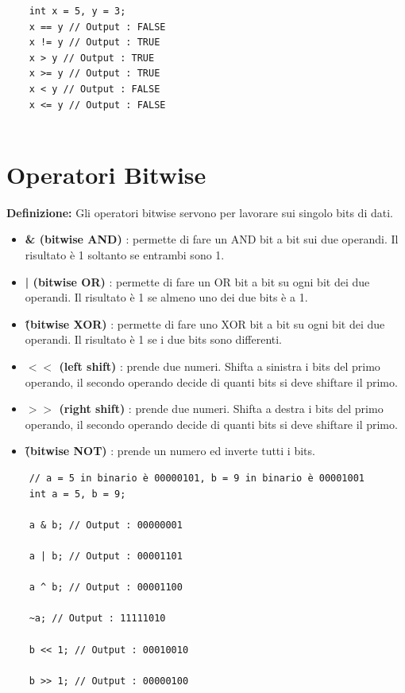 \begin{lstlisting}
	int x = 5, y = 3;
	x == y // Output : FALSE
	x != y // Output : TRUE
	x > y // Output : TRUE
	x >= y // Output : TRUE
	x < y // Output : FALSE
	x <= y // Output : FALSE
	
\end{lstlisting}


\section{Operatori Bitwise}

\textsf{\small \textbf{Definizione: } Gli operatori bitwise servono per lavorare sui singolo bits di dati.} \\

\begin{itemize}
	\item \textsf{\small \textbf{\& (bitwise AND)} : permette di fare un AND bit a bit sui due operandi. Il risultato è 1 soltanto se entrambi sono 1.}
	\item \textsf{\small \textbf{| (bitwise OR)} : permette di fare un OR bit a bit su ogni bit dei due operandi. Il risultato è 1 se almeno uno dei due bits è a 1.}
	\item \textsf{\small \textbf{\^  (bitwise XOR)} : permette di fare uno XOR bit a bit su ogni bit dei due operandi. Il risultato è 1 se i due bits sono differenti.}
	\item \textsf{\small \textbf{$<<$ (left shift)} : prende due numeri. Shifta a sinistra i bits del primo operando, il secondo operando decide di quanti bits si deve shiftare il primo.}
	\item \textsf{\small \textbf{$>>$ (right shift)} : prende due numeri. Shifta a destra i bits del primo operando, il secondo operando decide di quanti bits si deve shiftare il primo.}
	\item \textsf{\small \textbf{\~ (bitwise NOT)} : prende un numero ed inverte tutti i bits.}
\end{itemize}

\begin{lstlisting}
	// a = 5 in binario è 00000101, b = 9 in binario è 00001001
	int a = 5, b = 9;
	
	a & b; // Output : 00000001
	
	a | b; // Output : 00001101
	
	a ^ b; // Output : 00001100
	
	~a; // Output : 11111010
	
	b << 1; // Output : 00010010
	
	b >> 1; // Output : 00000100
	
	
\end{lstlisting}

